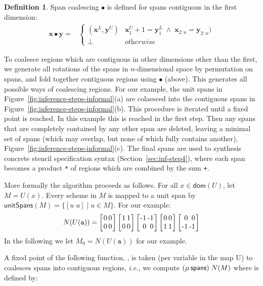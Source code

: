 \documentclass[9pt]{sigplanconf}
\newcounter{block}
\theoremstyle{definition}
\newtheorem{definition}[block]{Definition}
\newcommand{\ie}{\emph{i.e.}}
\newcommand{\vect}[1]{\textbf{#1}}
\newcommand{\vtwo}[2]{\setlength{\arraycolsep}{0em}
\left[\begin{array}{l}#1\\#2\end{array}\right]}
\newcommand{\stwo}[4]
{\setlength{\arraycolsep}{0.1em}
\left[\begin{array}{rr}$#1$ & $#3$\\$#2$ & $#4$\end{array}\right]}
\begin{document}
\begin{definition}\label{def:span-coalesc} Span
  coalescing $\bullet$ is defined for spans contiguous in the first dimension:
\begin{align*}
\vect{x} \bullet \vect{y}
= &
\begin{cases}
(\vect{x}^L, \vect{y}^U) & \vect{x}^U_1 + 1 = \vect{y}^L_1 \; \wedge \;
\vect{x}_{2:n} = \vect{y}_{2:n}) \\
\bot  & \textit{otherwise}
\end{cases}
\end{align*}
\end{definition}
\noindent
To coalesce regions which are contiguous in other dimensions
other than the first, we generate all rotations of the spans in
$n$-dimensional space by permutation on spans, and fold together contiguous
regions using $\bullet$ (above). This 
generates all possible ways of coalescing regions. For our example,
the unit spans in Figure~\ref{fig:inference-steps-informal}(a)
are colaesced into the contiguous spans in
Figure~\ref{fig:inference-steps-informal}(b).
This procedure is iterated until a fixed point is reached. In this
example this is reached in the first step. 
 Then any spans that are completely contained by any other span are deleted,
leaving a minimal set of spans (which may overlap, but none of which
fully contains another), Figure~\ref{fig:inference-steps-informal}(c).
The final spans are used to synthesis concrete stencil specification
syntax (Section~\ref{sec:inf-step4}), where
each span becomes a product \texttt{*} of regions which are 
combined by the sum \texttt{+}.

More formally the algorithm proceeds as follows.
For all $x \in \mathsf{dom}(U)$, let $M = U(x)$. Every scheme in $M$ 
is mapped to a unit span
by $\textsf{unitSpans}(M) = \{[u \; u] \mid u\!\in\!M\}$. For our example:
\begin{align*}
N(U(\texttt{a})) = \stwo{0}{0}{0}{0} \stwo{1}{0}{1}{0} \stwo{-1}{0}{-1}{0} \stwo{0}{1}{0}{1} \stwo{0}{-1}{0}{-1}
\end{align*}
In the following we let $M_0 = N(U(\texttt{a}))$ for our example.

A fixed point of the following function, \spanOp{}, is taken (per variable
in the map U) to coalesces spans into contiguous regions, \ie{}, we compute
 $(\mu \, \textsf{spans}) \; N(M)$ where \spanOp{} is defined by: \\[-0.5em]
\end{document}
